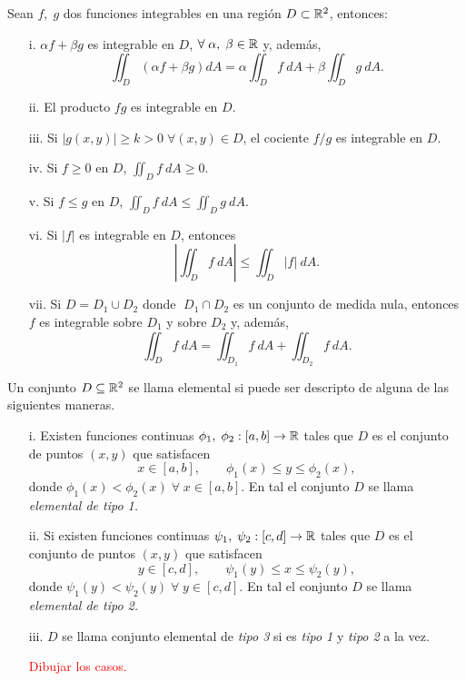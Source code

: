 \begin{propertie}
    Sean $f,\;g$ dos funciones integrables en una regi\'on $D\subset\mathbb{R}^2$, entonces:
    \begin{enumerate}
        \item[i.] $\alpha f+\beta g$ es integrable en $D$, $\forall\;\alpha,\;\beta\in\mathbb{R}$ y, adem\'as,
        \[
            \iint_D \left(\alpha f+\beta g\right)dA=\alpha\iint_D f\:dA+\beta\iint_D g\:dA.
        \]
        \item[ii.] El producto $fg$ es integrable en $D$.
        \item[iii.] Si $|g(x,y)|\geq k>0\;\forall(x,y)\in D$, el cociente $f/g$ es integrable en $D$.
        \item[iv.] Si $f\geq 0$ en $D$, $\iint_D f\:dA\geq0$.
        \item[v.]Si $f\leq g$ en $D$, $\iint_D f\:dA\leq\iint_D g\:dA.$
        \item[vi.]Si $|f|$ es integrable en $D$, entonces 
        \[
            \left|\iint_D f\:dA\right|\leq\iint_D|f|\:dA.  
        \]    
        \item[vii.] Si $D=D_1\cup D_2$ donde $\;D_1\cap D_2$ es un conjunto de medida nula, entonces   $f$ es integrable sobre $D_1$ y sobre $D_2$ y, adem\'as,  
        \[
            \iint_D f\:dA=\iint_{D_1} f\:dA+\iint_{D_2}f\:dA.    
        \]
    \end{enumerate}
\end{propertie}

\begin{definition}  Un conjunto  $D\subseteq\mathbb{R}^2$ se llama elemental si puede ser descripto de alguna de las siguientes maneras. 
   
    \begin{enumerate}
    \item[i.]
    Existen funciones continuas $\phi_1,\;\phi_2:[a,b]\to\mathbb{R}$ tales que $D$ es el conjunto de puntos $(x,y)$ que satisfacen
    \[
        x\in[a,b], \qquad \phi_1(x)\leq y\leq\phi_2(x),  
    \]%
    donde $\phi_1(x) < \phi_2(x)\;\forall\;x\in[a,b].$  En tal  el conjunto $D$ se llama  \textit{elemental de tipo 1.} 
    \item[ii.]
    Si existen funciones continuas $\psi_1,\;\psi_2:[c,d]\to\mathbb{R}$ tales que $D$ es el conjunto de puntos $(x,y)$ que satisfacen
    \[
        y\in[c,d], \qquad \psi_1(y)\leq x\leq\psi_2(y),  
    \]
    donde $\psi_1(y) < \psi_2(y)\;\forall\;y\in[c,d].$ En tal  el conjunto $D$ se llama  \textit{elemental de tipo 2.} 
    \item[iii.]
    $D$ se llama conjunto elemental de \textit{tipo 3} si es \textit{tipo 1} y \textit{tipo 2} a la vez.
    
    
    
    
    \textcolor{red}{Dibujar los casos.}
    
    
    \end{enumerate}
\end{definition}

